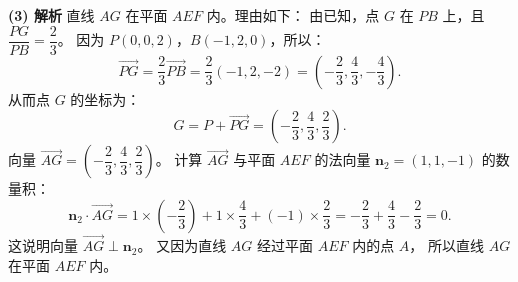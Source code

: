 \begin{answer}
\textbf{(3) 解析}
直线 $AG$ 在平面 $AEF$ 内。理由如下：
由已知，点 $G$ 在 $PB$ 上，且 $\dfrac{PG}{PB} = \dfrac{2}{3}$。
因为 $P(0, 0, 2)$，$B(-1, 2, 0)$，所以：
\nopagebreak[4]
\[\vec{PG} = \frac{2}{3}\vec{PB} = \frac{2}{3}(-1, 2, -2) = \left(-\frac{2}{3}, \frac{4}{3}, -\frac{4}{3}\right).\]
从而点 $G$ 的坐标为：
\nopagebreak[4]
\[G = P + \vec{PG} = \left(-\frac{2}{3}, \frac{4}{3}, \frac{2}{3}\right).\]
向量 $\vec{AG} = \left(-\dfrac{2}{3}, \dfrac{4}{3}, \dfrac{2}{3}\right)$。
计算 $\vec{AG}$ 与平面 $AEF$ 的法向量 $\boldsymbol{n}_2 = (1, 1, -1)$ 的数量积：
\nopagebreak[4]
\[\boldsymbol{n}_2 \cdot \vec{AG} = 1 \times \left(-\frac{2}{3}\right) + 1 \times \frac{4}{3} + (-1) \times \frac{2}{3} = -\frac{2}{3} + \frac{4}{3} - \frac{2}{3} = 0.\]
这说明向量 $\vec{AG} \perp \boldsymbol{n}_2$。
又因为直线 $AG$ 经过平面 $AEF$ 内的点 $A$，
所以直线 $AG$ 在平面 $AEF$ 内。




\end{answer}
